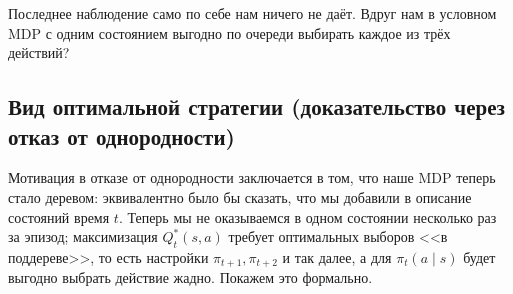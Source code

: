 Последнее наблюдение само по себе нам ничего не даёт. Вдруг нам в условном MDP с одним состоянием выгодно по очереди выбирать каждое из трёх действий?

\subsection{Вид оптимальной стратегии (доказательство через отказ от однородности)}

Мотивация в отказе от однородности заключается в том, что наше MDP теперь стало деревом: эквивалентно было бы сказать, что мы добавили в описание состояний время $t$. Теперь мы не оказываемся в одном состоянии несколько раз за эпизод; максимизация $Q^*_t(s, a)$ требует оптимальных выборов <<в поддереве>>, то есть настройки $\pi_{t+1}, \pi_{t+2}$ и так далее, а для $\pi_t(a \mid s)$ будет выгодно выбрать действие жадно. Покажем это формально.

